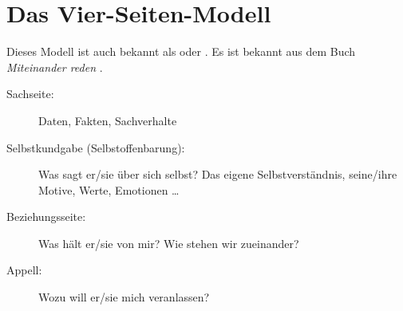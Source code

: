 \section{Das Vier-Seiten-Modell}
\label{4-ohren}

Dieses Modell ist auch bekannt als  oder . Es ist bekannt aus dem Buch \emph{Miteinander reden} \cite{miteinander-reden-1}.

\begin{description}
    \item[Sachseite:] Daten, Fakten, Sachverhalte
    \item[Selbstkundgabe (Selbstoffenbarung):] Was sagt er/sie über sich selbst? Das eigene Selbstverständnis, seine/ihre Motive, Werte, Emotionen \ldots
    \item[Beziehungsseite:] Was hält er/sie von mir? Wie stehen wir zueinander?
    \item[Appell:] Wozu will er/sie mich veranlassen?
\end{description}
